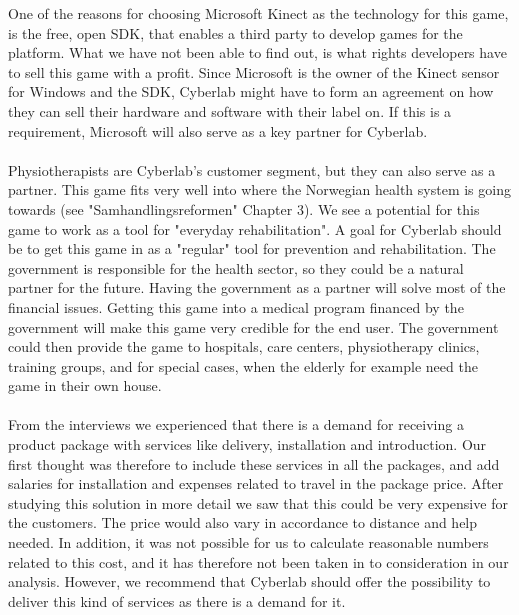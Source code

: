 One of the reasons for choosing Microsoft Kinect as the technology for this game, is the free, open SDK, that enables a third party to develop games for the platform. What we have not been able to find out, is what rights developers have to sell this game with a profit. Since Microsoft is the owner of the Kinect sensor for Windows and the SDK, Cyberlab might have to form an agreement on how they can sell their hardware and software with their label on. If this is a requirement, Microsoft will also serve as a key partner for Cyberlab. \\ \\
Physiotherapists are Cyberlab's customer segment, but they can also serve as a partner. This game fits very well into where the Norwegian health system is going towards (see "Samhandlingsreformen" Chapter 3). We see a potential for this game to work as a tool for "everyday rehabilitation". A goal for Cyberlab should be to get this game in as a "regular" tool for prevention and rehabilitation. The government is responsible for the health sector, so they could be a natural partner for the future. Having the government as a partner will solve most of the financial issues. Getting this game into a medical program financed by the government will make this game very credible for the end user. The government could then provide the game to hospitals, care centers, physiotherapy clinics, training groups, and for special cases, when the elderly for example need the game in their own house. \\ \\ 
From the interviews we experienced that there is a demand for receiving a product package with services like delivery, installation and introduction. Our first thought was therefore to include these services in all the packages, and add salaries for installation and expenses related to travel in the package price. After studying this solution in more detail we saw that this could be very expensive for the customers. The price would also vary in accordance to distance and help needed. In addition, it was not possible for us to calculate reasonable numbers related to this cost, and it has therefore not been taken in to consideration in our analysis. However, we recommend that Cyberlab should offer the possibility to deliver this kind of services as there is a demand for it. \\ \\   
